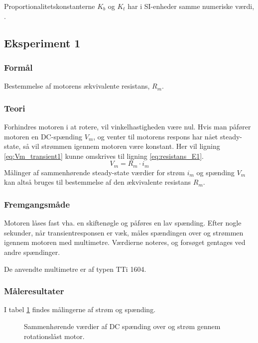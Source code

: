 Proportionalitetskonstanterne \(K_b\) og \(K_t\) har i SI-enheder samme numeriske værdi, \citep[Physical setup]{matlabdcmodel}.

\subsection{Eksperiment 1}
\label{ss:eksperiment1}
\subsubsection{Formål}
Bestemmelse af motorens ækvivalente resistans, \(R_m\).
\subsubsection{Teori}
Forhindres motoren i at rotere, vil vinkelhastigheden være nul.
Hvis man påfører motoren en DC-spænding \(V_m\),
og venter til motorens respons har nået steady-state,
så vil strømmen igennem motoren være konstant.
Her vil ligning \ref{eq:Vm_transient1} kunne omskrives til ligning \ref{eq:resistans_E1}.
\begin{equation}
	V_m=R_m \cdot i_m
	\label{eq:resistans_E1} 
 \end{equation}
Målinger af sammenhørende steady-state værdier for strøm \(i_m\) og spænding \(V_m\)
kan altså bruges til bestemmelse af den ækvivalente resistans \(R_m\).
\subsubsection{Fremgangsmåde}
Motoren låses fast vha. en skiftenøgle og påføres en lav spænding.
Efter nogle sekunder, når transientresponsen er væk,
måles spændingen over og strømmen igennem motoren med multimetre.
Værdierne noteres, og forsøget gentages ved andre spændinger.

De anvendte multimetre er af typen TTi 1604.
\subsubsection{Måleresultater}
I tabel \ref{tb:resistans} findes målingerne af strøm og spænding.
\begin{figure}[th!]
	\centering
	
	\captionsetup{type=table}
	\caption[Sammenhørende værdier af DC spænding og strøm]
			{Sammenhørende værdier af DC spænding over og strøm gennem rotationslåst motor.}
	\label{tb:resistans}
\end{figure}
